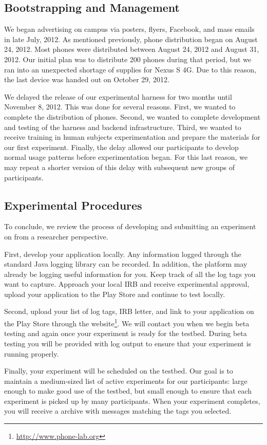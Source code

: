 

\subsection{Bootstrapping and Management}

We began advertising \PhoneLab{} on campus via posters, flyers, Facebook, and
mass emails in late July, 2012. As mentioned previously, \PhoneLab{} phone
distribution began on August 24, 2012. Most phones were distributed between
August 24, 2012 and August 31, 2012. Our initial plan was to distribute 200
phones during that period, but we ran into an unexpected shortage of
supplies for Nexus S 4G. Due to this reason, the last device was handed out on
October 29, 2012.

We delayed the release of our experimental harness for two months until
November 8, 2012. This was done for several reasons. First, we wanted to
complete the distribution of phones. Second, we wanted to complete development
and testing of the harness and backend infrastructure. Third, we wanted to
receive training in human subjects experimentation and prepare the materials for
our first experiment. Finally, the delay allowed our participants to develop
normal usage patterns before experimentation began. For this last reason, we may
repeat a shorter version of this delay with subsequent new groups of \PhoneLab{}
participants.

\subsection{Experimental Procedures}

To conclude, we review the process of developing and submitting an experiment
on \PhoneLab{} from a researcher perspective.

First, develop your application locally. Any information logged through the
standard Java logging library can be recorded. In addition, the platform may
already be logging useful information for you. Keep track of all the log tags
you want \PhoneLab{} to capture. Approach your local IRB and receive
experimental approval, upload your application to the Play Store and continue
to test locally.

Second, upload your list of log tags, IRB letter, and link to your
application on the Play Store through the \PhoneLab{}
website\footnote{\url{http://www.phone-lab.org}}. We will contact you when we
begin beta testing and again once your experiment is ready for the testbed.
During beta testing you will be provided with \PhoneLab{} log output to ensure
that your experiment is running properly.

Finally, your experiment will be scheduled on the testbed. Our goal is to
maintain a medium-sized list of active experiments for our participants:
large enough to make good use of the testbed, but small enough to ensure that
each experiment is picked up by many participants. When your experiment
completes, you will receive a archive with messages matching the tags you
selected.
